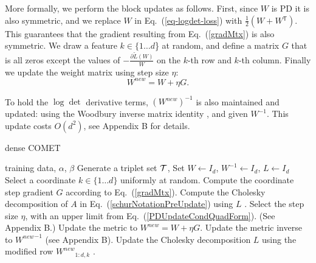 \documentclass[twoside,11pt]{article}
\newcommand\mat[1]{{#1}}
\newcommand{\T}{{}^\mathsf{T}}
\newcommand{\W}{\mat{W}}
\newcommand{\newW}{{\mat{W^{new}}}}
\newcommand{\tL}{\tilde{L}(\W)}
\newcommand{\cholL}{\mat{L}}
\newcommand{\A}{\mat{A}}
\newcommand{\grd}{\frac{\partial \tL}{\W}}
\renewcommand{\eqref}[1]{Eq.~(\ref{#1})}
\begin{document}
More formally, we perform the block updates as follows. First, since $\W$ is PD it is also symmetric, and we replace $\W$ in \eqref{eq-logdet-loss} with $\tfrac{1}{2}(\W + \W\T)$. This guarantees that the gradient resulting from \eqref{gradMtx} is also symmetric. We draw a feature $k \in \{1 \ldots d$\} at random, and define a matrix $\mat{G}$ that is all zeros except the values of $-\grd$ on the $k$-th row and $k$-th column. Finally we update the weight matrix using step size $\eta$:
\begin{equation}
    \newW = \W +\eta \mat{G}.
\label{updateEq}
\end{equation}

To hold the $\log\det$ derivative terms, $(\newW)^{-1}$ is also maintained and updated: using the Woodbury inverse matrix identity \citep{woodbury1950inverting}, and given $\W^{-1}$. This update costs $O(d^2)$, see Appendix B for details.

\begin{algorithm}[th]
   \caption{dense COMET}
   \label{alg:comet}
\begin{algorithmic}[1]
    training data, $\alpha$, $\beta$
   \STATE Generate a triplet set $\cal{T}$, Set  $\W  \leftarrow I_d$, $\W^{-1}  \leftarrow I_d$, $\cholL  \leftarrow I_d$
   \REPEAT 
   \STATE Select a coordinate $k \in \{1 \ldots d\}$ uniformly at random.
   \STATE Compute the coordinate step gradient $\mat{G}$ according to \eqref{gradMtx}.
   \STATE Compute the Cholesky decomposition of $\A$ in \eqref{schurNotationPreUpdate} using $\cholL$ \citep{Davis05rowchol}.
   \STATE Select the step size $\eta$, with an upper limit from \eqref{PDUpdateCondQuadForm}. (See Appendix B.)
   \STATE Update the metric to $\newW=\W+\eta G$.
   \STATE Update the metric inverse to $\newW^{-1}$ (see Appendix B).
   \STATE Update the Cholesky decomposition $\cholL$ using the modified row $\newW_{1:d,k}$ \citep{Davis05rowchol}.
\end{algorithmic}
\end{algorithm}
\end{document}
